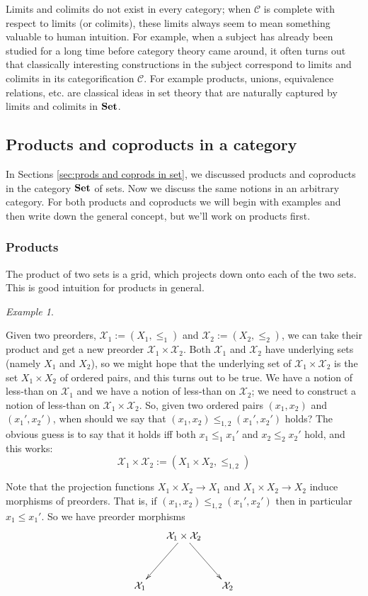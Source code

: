 \documentclass{book}
\def\mc{\mathcal}
\def\to{\rightarrow}
\def\Set{{\bf Set}}
\def\mcC{\mc{C}}
\def\mcX{\mc{X}}
\theoremstyle{remark}
\newtheorem{example}[subsubsection]{Example}
\theoremstyle{definition}
\begin{document}
Limits and colimits do not exist in every category; when $\mcC$ is complete with respect to limits (or colimits), these limits always seem to mean something valuable to human intuition. For example, when a subject has already been studied for a long time before category theory came around, it often turns out that classically interesting constructions in the subject correspond to limits and colimits in its categorification $\mcC$. For example products, unions, equivalence relations, etc. are classical ideas in set theory that are naturally captured by limits and colimits in $\Set$. 


\subsection{Products and coproducts in a category}

In Sections \ref{sec:prods and coprods in set}, we discussed products and coproducts in the category $\Set$ of sets. Now we discuss the same notions in an arbitrary category. For both products and coproducts we will begin with examples and then write down the general concept, but we'll work on products first.


\subsubsection{Products}

The product of two sets is a grid, which projects down onto each of the two sets. This is good intuition for products in general.

\begin{example}\label{ex:product of preorders}

Given two preorders, $\mcX_1:=(X_1,\leq_1)$ and $\mcX_2:=(X_2,\leq_2)$, we can take their product and get a new preorder $\mcX_1\times\mcX_2$. Both $\mcX_1$ and $\mcX_2$ have underlying sets (namely $X_1$ and $X_2$), so we might hope that the underlying set of $\mcX_1\times\mcX_2$ is the set $X_1\times X_2$ of ordered pairs, and this turns out to be true. We have a notion of less-than on $\mcX_1$ and we have a notion of less-than on $\mcX_2$; we need to construct a notion of less-than on $\mcX_1\times\mcX_2$. So, given two ordered pairs $(x_1,x_2)$ and $(x_1',x_2')$, when should we say that $(x_1,x_2)\leq_{1,2}(x_1',x_2')$ holds? The obvious guess is to say that it holds iff both $x_1\leq_1x_1'$ and $x_2\leq_2x_2'$ hold, and this works:
$$\mcX_1\times\mcX_2:=(X_1\times X_2,\leq_{1,2})$$

Note that the projection functions $X_1\times X_2\to X_1$ and $X_1\times X_2\to X_2$ induce morphisms of preorders. That is, if $(x_1,x_2)\leq_{1,2}(x_1',x_2')$ then in particular $x_1\leq x_1'$. So we have preorder morphisms
$$\xymatrix@=15pt{&\mcX_1\times\mcX_2\ar[ldd]\ar[rdd]\\\\\mcX_1&&\mcX_2}$$

\end{example}
\end{document}
